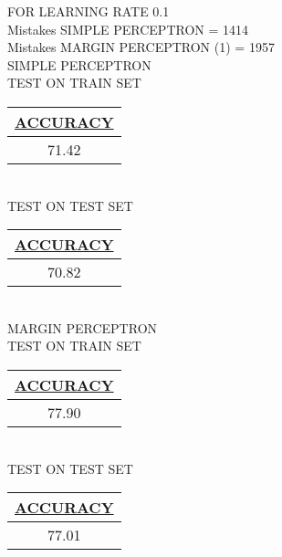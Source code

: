 \documentclass[11pt]{article}
\begin{document}
\newpage
FOR LEARNING RATE 0.1
\\Mistakes SIMPLE PERCEPTRON = 1414
\\Mistakes MARGIN PERCEPTRON (1) = 1957
\\SIMPLE PERCEPTRON
\\TEST ON TRAIN SET 
\bgroup 
\def\arraystretch{1.2}
\begin{tabular}{|c|} \hline 
{\bf \underline {ACCURACY}} \\ \hline
71.42 \\ \hline
\end{tabular}
\egroup
\\TEST ON TEST SET
\bgroup 
\def\arraystretch{1.2}
\begin{tabular}{|c|} \hline 
{\bf \underline {ACCURACY}} \\ \hline
70.82  \\ \hline
\end{tabular}
\egroup
\\[15pt]MARGIN PERCEPTRON
\\TEST ON TRAIN SET 
\bgroup 
\def\arraystretch{1.2}
\begin{tabular}{|c|} \hline 
{\bf \underline {ACCURACY}} \\ \hline
77.90  \\ \hline
\end{tabular}
\egroup
\\TEST ON TEST SET
\bgroup 
\def\arraystretch{1.2}
\begin{tabular}{|c|} \hline 
{\bf \underline {ACCURACY}} \\ \hline
77.01 \\ \hline
\end{tabular}
\egroup

\newpage
\end{document}
